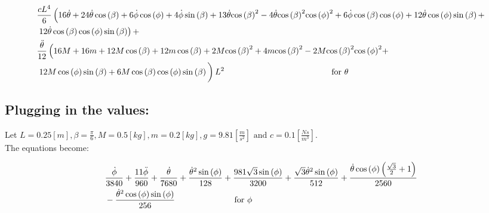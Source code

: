 \begin{equation}
    \begin{split}
        &\frac{cL^4}{6}\left(16\dot\theta+24\dot\theta\cos\left(\beta \right)+6\mathrm{\dot\phi}\cos\left(\phi \right)+4\mathrm{\dot\phi}\sin\left(\beta \right)+13\dot\theta{\cos\left(\beta \right)}^2-4\dot\theta{\cos\left(\beta \right)}^2{\cos\left(\phi \right)}^2+6\mathrm{\dot\phi}\cos\left(\beta \right)\cos\left(\phi \right)+12\dot\theta\cos\left(\phi \right)\sin\left(\beta \right)+\right.\\
        &\left.12\dot\theta\cos\left(\beta \right)\cos\left(\phi \right)\sin\left(\beta \right)\right)+\\
        &\frac{\mathrm{\ddot\theta}}{12} \left(16M+16m+12M\cos\left(\beta \right)+12m\cos\left(\beta \right)+2M{\cos\left(\beta \right)}^2+4m{\cos\left(\beta \right)}^2-2M{\cos\left(\beta \right)}^2{\cos\left(\phi \right)}^2+\right.\\
        &\left.12M\cos\left(\phi \right)\sin\left(\beta \right)+6M\cos\left(\beta \right)\cos\left(\phi \right)\sin\left(\beta \right)\vphantom{\int}\right)L^2\hspace{45mm}\text{for } \theta
    \end{split}
\end{equation}


\subsection{Plugging in the values:}

Let $L = 0.25 [m], \beta = \frac{\pi}{6},M= 0.5 [kg],m= 0.2 [kg], g = 9.81[\frac{m}{s^2}] \text{ and } c = 0.1[\frac{Ns}{m^3}]$.\vspace{3mm}\\

The equations become:

\begin{equation}
    \begin{split}
        &\frac{\mathrm{\dot\phi}}{3840}+\frac{11\mathrm{\ddot\phi}}{960}+\frac{\dot\theta}{7680}+\frac{{\dot\theta}^2\sin\left(\phi \right)}{128}+\frac{981\sqrt{3}\sin\left(\phi \right)}{3200}+\frac{\sqrt{3}{\dot\theta}^2\sin\left(\phi \right)}{512}+\frac{\dot\theta\cos\left(\phi \right)\left(\frac{\sqrt{3}}{2}+1\right)}{2560}\\
        &-\frac{{\dot\theta}^2\cos\left(\phi \right)\sin\left(\phi \right)}{256}\hspace{25mm} \text{for } \phi
    \end{split}
\end{equation}

